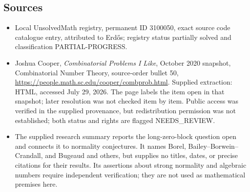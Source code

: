 \documentclass[11pt]{article}
\begin{document}
\subsection{Sources}
\begin{itemize}
\item Local UnsolvedMath registry, permanent ID 3100050, exact source code catalogue entry, attributed to Erd\H{o}s; registry status partially solved and classification PARTIAL-PROGRESS.
\item Joshua Cooper, \emph{Combinatorial Problems I Like}, October 2020 snapshot, Combinatorial Number Theory, source-order bullet 50, \url{https://people.math.sc.edu/cooper/combprob.html}. Supplied extraction: HTML, accessed July 29, 2026. The page labels the item open in that snapshot; later resolution was not checked item by item. Public access was verified in the supplied provenance, but redistribution permission was not established; both status and rights are flagged NEEDS\_REVIEW.
\item The supplied research summary reports the long-zero-block question open and connects it to normality conjectures. It names Borel, Bailey--Borwein--Crandall, and Bugeaud and others, but supplies no titles, dates, or precise citations for their results. Its assertions about strong normality and algebraic numbers require independent verification; they are not used as mathematical premises here.
\end{itemize}
\end{document}

